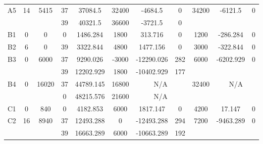 \begin{sidewaystable}
\begin{tabular}{c||c|c||c|c|c|c|c||c|c|c}
         &
        
      \\
      \hline
      \multirow{2}{*}{A5} &
      \multirow{2}{*}{14} &
      \multirow{2}{*}{5415} &
      37 &
      37084.5 &
      32400 &
        -4684.5 &
        0 &
      \multirow{2}{*}{34200} &
        \multirow{2}{*}{-6121.5} &
        \multirow{2}{*}{0}
      \\
      \cline{4-8}
       &
       &
       &
      39 &
      40321.5 &
      36600 &
        -3721.5 &
        0 &
      
         &
        
      \\
      \hline
      \multirow{1}{*}{B1} &
      \multirow{1}{*}{0} &
      \multirow{1}{*}{0} &
      0 &
      1486.284 &
      1800 &
        313.716 &
        0 &
      \multirow{1}{*}{1200} &
        \multirow{1}{*}{-286.284} &
        \multirow{1}{*}{0}
      \\
      \hline
      \multirow{1}{*}{B2} &
      \multirow{1}{*}{6} &
      \multirow{1}{*}{0} &
      39 &
      3322.844 &
      4800 &
        1477.156 &
        0 &
      \multirow{1}{*}{3000} &
        \multirow{1}{*}{-322.844} &
        \multirow{1}{*}{0}
      \\
      \hline
      \multirow{2}{*}{B3} &
      \multirow{2}{*}{0} &
      \multirow{2}{*}{6000} &
      37 &
      9290.026 &
      -3000 &
        -12290.026 &
        282 &
      \multirow{2}{*}{6000} &
        \multirow{2}{*}{-6202.929} &
        \multirow{2}{*}{0}
      \\
      \cline{4-8}
       &
       &
       &
      39 &
      12202.929 &
      1800 &
        -10402.929 &
        177 &
      
         &
        
      \\
      \hline
      \multirow{2}{*}{B4} &
      \multirow{2}{*}{0} &
      \multirow{2}{*}{16020} &
      37 &
      44789.145 &
      16800 &
        \multicolumn{2}{|c||}{N/A} &
      \multirow{2}{*}{32400} &
        \multicolumn{2}{c}{\multirow{2}{*}{N/A}}
      \\
      \cline{4-8}
       &
       &
       &
      0 &
      48215.576 &
      21600 &
        \multicolumn{2}{|c||}{N/A} &
      
        
      \\
      \hline
      \multirow{1}{*}{C1} &
      \multirow{1}{*}{0} &
      \multirow{1}{*}{840} &
      0 &
      4182.853 &
      6000 &
        1817.147 &
        0 &
      \multirow{1}{*}{4200} &
        \multirow{1}{*}{17.147} &
        \multirow{1}{*}{0}
      \\
      \hline
      \multirow{2}{*}{C2} &
      \multirow{2}{*}{16} &
      \multirow{2}{*}{8940} &
      37 &
      12493.288 &
      0 &
        -12493.288 &
        294 &
      \multirow{2}{*}{7200} &
        \multirow{2}{*}{-9463.289} &
        \multirow{2}{*}{0}
      \\
      \cline{4-8}
       &
       &
       &
      39 &
      16663.289 &
      6000 &
        -10663.289 &
        192 &
      

\end{tabular}
\end{sidewaystable}
